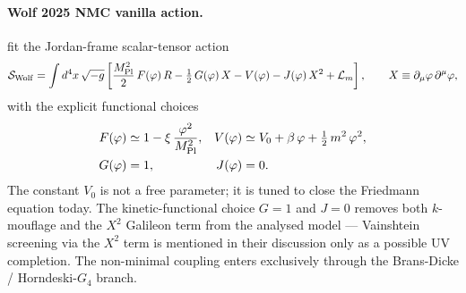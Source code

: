 \paragraph{Wolf 2025 NMC vanilla action.}
\citet{wolf2025nmc} fit the Jordan-frame scalar-tensor action
\begin{equation}
\mathcal{S}_{\rm Wolf} = \int d^4x\,\sqrt{-g}\left[
   \frac{M_{\rm Pl}^2}{2}\,F(\varphi)\,R
   - \tfrac{1}{2}\,G(\varphi)\,X
   - V(\varphi)
   - J(\varphi)\,X^2
   + \mathcal{L}_m
\right],
\qquad X \equiv \partial_\mu\varphi\,\partial^\mu\varphi,
\label{eq:wolf-action-general}
\end{equation}
with the explicit functional choices
\begin{align}
F(\varphi) &\simeq 1 - \xi\,\frac{\varphi^2}{M_{\rm Pl}^2}, &
V(\varphi) &\simeq V_0 + \beta\,\varphi + \tfrac{1}{2}\,m^2\,\varphi^2, \\
G(\varphi) &= 1, &
J(\varphi) &= 0.
\label{eq:wolf-functionals}
\end{align}
The constant $V_0$ is not a free parameter; it is tuned to close the Friedmann
equation today. The kinetic-functional choice $G=1$ and $J=0$ removes both
$k$-mouflage and the $X^2$ Galileon term from the analysed model — Vainshtein
screening via the $X^2$ term is mentioned in their discussion only as a possible
UV completion. The non-minimal coupling enters exclusively through the
Brans-Dicke / Horndeski-$G_4$ branch.

